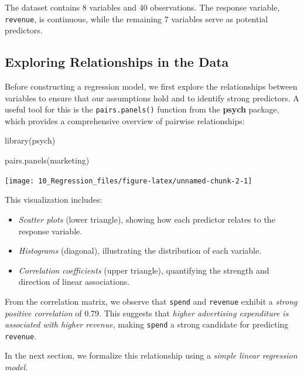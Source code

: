 \documentclass[
  11pt,
]{book}
\makeatletter
\newenvironment{Shaded}{}{}
\newcommand{\FunctionTok}[1]{#1}
\newcommand{\NormalTok}[1]{#1}
\providecommand{\tightlist}{%
  \setlength{\itemsep}{0pt}\setlength{\parskip}{0pt}}
\newenvironment{kframe}{%
\medskip{}
\setlength{\fboxsep}{.8em}
 \def\at@end@of@kframe{}%
 \ifinner\ifhmode%
  \def\at@end@of@kframe{\end{minipage}}%
  \begin{minipage}{\columnwidth}%
 \fi\fi%
 \def\FrameCommand##1{\hskip\@totalleftmargin \hskip-\fboxsep
 \colorbox{shadecolor}{##1}\hskip-\fboxsep
     \hskip-\linewidth \hskip-\@totalleftmargin \hskip\columnwidth}%
 \MakeFramed {\advance\hsize-\width
   \@totalleftmargin\z@ \linewidth\hsize
   \@setminipage}}%
 {\par\unskip\endMakeFramed%
 \at@end@of@kframe}
\renewenvironment{Shaded}{\begin{kframe}}{\end{kframe}}
\theoremstyle{definition}
\theoremstyle{definition}
\theoremstyle{definition}
\theoremstyle{definition}
\theoremstyle{remark}
\makeatother
\begin{document}
The dataset contains 8 variables and 40 observations. The response variable, \texttt{revenue}, is continuous, while the remaining 7 variables serve as potential predictors.

\subsection*{Exploring Relationships in the Data}\label{exploring-relationships-in-the-data}


Before constructing a regression model, we first explore the relationships between variables to ensure that our assumptions hold and to identify strong predictors. A useful tool for this is the \texttt{pairs.panels()} function from the \textbf{psych} package, which provides a comprehensive overview of pairwise relationships:

\begin{Shaded}
\begin{Highlighting}[]
\FunctionTok{library}\NormalTok{(psych)}

\FunctionTok{pairs.panels}\NormalTok{(marketing)}
\end{Highlighting}
\end{Shaded}

\begin{center}\texttt{[image: 10\_Regression\_files/figure-latex/unnamed-chunk-2-1]} \end{center}

This visualization includes:

\begin{itemize}
\tightlist
\item
  \emph{Scatter plots} (lower triangle), showing how each predictor relates to the response variable.\\
\item
  \emph{Histograms} (diagonal), illustrating the distribution of each variable.\\
\item
  \emph{Correlation coefficients} (upper triangle), quantifying the strength and direction of linear associations.
\end{itemize}

From the correlation matrix, we observe that \texttt{spend} and \texttt{revenue} exhibit a \emph{strong positive correlation} of 0.79. This suggests that \emph{higher advertising expenditure is associated with higher revenue}, making \texttt{spend} a strong candidate for predicting \texttt{revenue}.

In the next section, we formalize this relationship using a \emph{simple linear regression model}.
\end{document}
